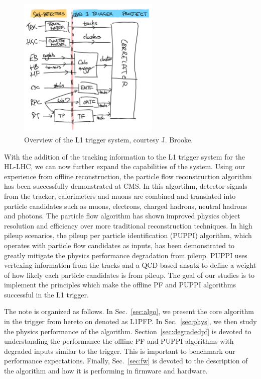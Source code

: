 \begin{figure}[htb]
\centering
\includegraphics[width=0.6\textwidth] {figures/system.pdf}
\caption{
Overview of the L1 trigger system, courtesy J. Brooke.
\label{fig:overview}
}
\end{figure}

With the addition of the tracking information to the L1 trigger system for the HL-LHC, we can now further expand the capabilities of the system.
Using our experience from offline reconstruction, the particle flow reconstruction algorithm has been successfully demonstrated at CMS.
In this algortihm, detector signals from the tracker, calorimeters and muons are combined and translated into particle candidates such as muons, electrons, charged hadrons, neutral hadrons and photons.
The particle flow algorithm has shown improved physics object resolution and efficiency over more traditional reconstruction techniques. 
In high pileup scenarios, the pileup per particle identification (PUPPI) algorithm, which operates with particle flow candidates as inputs, has been demonstrated to greatly mitigate the physics performance degradation from pileup.  
PUPPI uses vertexing information from the tracks and a QCD-based ansatz to define a weight
of how likely each particle candidates is from pileup.  
The goal of our studies is to implement the principles which make the offline PF and PUPPI algorithms successful 
in the L1 trigger.  

The note is organized as follows.
In Sec.~\ref{sec:algo}, we present the core algorithm in the trigger from hereto on denoted as L1PFP.
In Sec.~\ref{sec:phys}, we then study the physics performance of the algorithm. 
Section~\ref{sec:degradedpf} is devoted to understanding the performance the offline PF and PUPPI algorithms with degraded inputs similar to the trigger.  This is important to benchmark our performance expectations.  
Finally, Sec.~\ref{sec:fw} is devoted to the description of the algorithm and how it is performing in firmware and hardware.  




